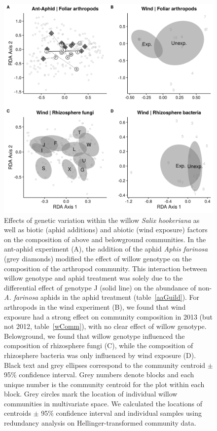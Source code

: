 \documentclass[11pt]{article}
\begin{document}
\begin{figure}[h!]
\centering
\includegraphics[scale = 0.65]{fig_2.png}
\caption{Effects of genetic variation within the willow
\emph{\textit{Salix hookeriana}} as well as biotic (aphid additions) and
abiotic (wind exposure) factors on the composition of above and
belowground communities. In the ant-aphid experiment (A), the addition
of the aphid \emph{Aphis farinosa} (grey diamonds) modified the
effect of willow genotype on the composition of the arthropod community.
This interaction between willow genotype and aphid treatment was solely
due to the differential effect of genotype J (solid line) on the
abundance of non-\emph{A. farinosa} aphids in the aphid treatment (table~\ref{aaGuild}).
For arthropods in the wind experiment (B), we found that wind exposure
had a strong effect on community composition in 2013 (but not 2012,
table~\ref{wComm}), with no clear effect of willow genotype. Belowground, we
found that willow genotype influenced the composition of rhizosphere
fungi (C), while the composition of rhizosphere bacteria was only influenced
by wind exposure (D). Black text and grey ellipses correspond to the
community centroid $\pm$ 95\% confidence interval. Grey numbers denote
blocks and each unique number is the community centroid for the plot
within each block. Grey circles mark the location of individual willow
communities in multivariate space. We calculated the locations of
centroids $\pm$ 95\% confidence interval and individual samples using
redundancy analysis on Hellinger-transformed community data.}
\label{Fig:GxEcomp}
\end{figure}
\end{document}
